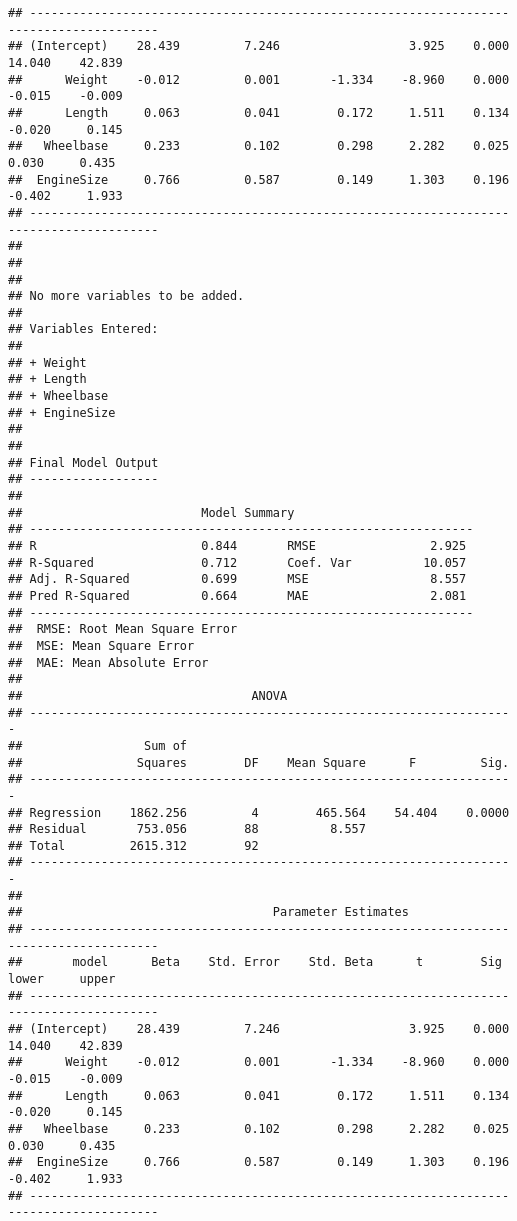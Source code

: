 \documentclass[
]{book}
\begin{document}
\begin{verbatim}
## ----------------------------------------------------------------------------------------
## (Intercept)    28.439         7.246                  3.925    0.000    14.040    42.839 
##      Weight    -0.012         0.001       -1.334    -8.960    0.000    -0.015    -0.009 
##      Length     0.063         0.041        0.172     1.511    0.134    -0.020     0.145 
##   Wheelbase     0.233         0.102        0.298     2.282    0.025     0.030     0.435 
##  EngineSize     0.766         0.587        0.149     1.303    0.196    -0.402     1.933 
## ----------------------------------------------------------------------------------------
## 
## 
## 
## No more variables to be added.
## 
## Variables Entered: 
## 
## + Weight 
## + Length 
## + Wheelbase 
## + EngineSize 
## 
## 
## Final Model Output 
## ------------------
## 
##                         Model Summary                          
## --------------------------------------------------------------
## R                       0.844       RMSE                2.925 
## R-Squared               0.712       Coef. Var          10.057 
## Adj. R-Squared          0.699       MSE                 8.557 
## Pred R-Squared          0.664       MAE                 2.081 
## --------------------------------------------------------------
##  RMSE: Root Mean Square Error 
##  MSE: Mean Square Error 
##  MAE: Mean Absolute Error 
## 
##                                ANOVA                                 
## --------------------------------------------------------------------
##                 Sum of                                              
##                Squares        DF    Mean Square      F         Sig. 
## --------------------------------------------------------------------
## Regression    1862.256         4        465.564    54.404    0.0000 
## Residual       753.056        88          8.557                     
## Total         2615.312        92                                    
## --------------------------------------------------------------------
## 
##                                   Parameter Estimates                                    
## ----------------------------------------------------------------------------------------
##       model      Beta    Std. Error    Std. Beta      t        Sig      lower     upper 
## ----------------------------------------------------------------------------------------
## (Intercept)    28.439         7.246                  3.925    0.000    14.040    42.839 
##      Weight    -0.012         0.001       -1.334    -8.960    0.000    -0.015    -0.009 
##      Length     0.063         0.041        0.172     1.511    0.134    -0.020     0.145 
##   Wheelbase     0.233         0.102        0.298     2.282    0.025     0.030     0.435 
##  EngineSize     0.766         0.587        0.149     1.303    0.196    -0.402     1.933 
## ----------------------------------------------------------------------------------------
\end{verbatim}
\end{document}
